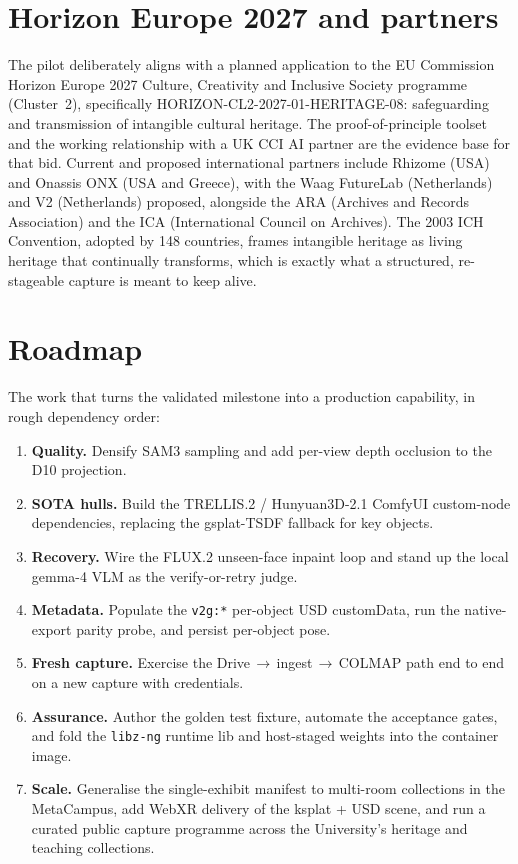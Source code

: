 \documentclass[a4paper,11pt]{report}
\newcommand{\code}[1]{\texttt{#1}}
\begin{document}
\section{Horizon Europe 2027 and partners}
The pilot deliberately aligns with a planned application to the EU Commission Horizon Europe 2027 Culture,
Creativity and Inclusive Society programme (Cluster~2), specifically HORIZON-CL2-2027-01-HERITAGE-08:
safeguarding and transmission of intangible cultural heritage. The proof-of-principle toolset and the
working relationship with a UK CCI AI partner are the evidence base for that bid. Current and proposed
international partners include Rhizome (USA) and Onassis ONX (USA and Greece), with the Waag FutureLab
(Netherlands) and V2 (Netherlands) proposed, alongside the ARA (Archives and Records Association) and the
ICA (International Council on Archives). The 2003 ICH Convention, adopted by 148 countries, frames
intangible heritage as living heritage that continually transforms, which is exactly what a structured,
re-stageable capture is meant to keep alive.

\section{Roadmap}
The work that turns the validated milestone into a production capability, in rough dependency order:

\begin{enumerate}
  \item \textbf{Quality.} Densify SAM3 sampling and add per-view depth occlusion to the D10 projection.
  \item \textbf{SOTA hulls.} Build the TRELLIS.2 / Hunyuan3D-2.1 ComfyUI custom-node dependencies, replacing
        the gsplat-TSDF fallback for key objects.
  \item \textbf{Recovery.} Wire the FLUX.2 unseen-face inpaint loop and stand up the local gemma-4 VLM as
        the verify-or-retry judge.
  \item \textbf{Metadata.} Populate the \code{v2g:*} per-object USD customData, run the native-export parity
        probe, and persist per-object pose.
  \item \textbf{Fresh capture.} Exercise the Drive\,$\rightarrow$\,ingest\,$\rightarrow$\,COLMAP path end to
        end on a new capture with credentials.
  \item \textbf{Assurance.} Author the golden test fixture, automate the acceptance gates, and fold the
        \code{libz-ng} runtime lib and host-staged weights into the container image.
  \item \textbf{Scale.} Generalise the single-exhibit manifest to multi-room collections in the MetaCampus,
        add WebXR delivery of the ksplat + USD scene, and run a curated public capture programme across the
        University's heritage and teaching collections.
\end{enumerate}
\end{document}
